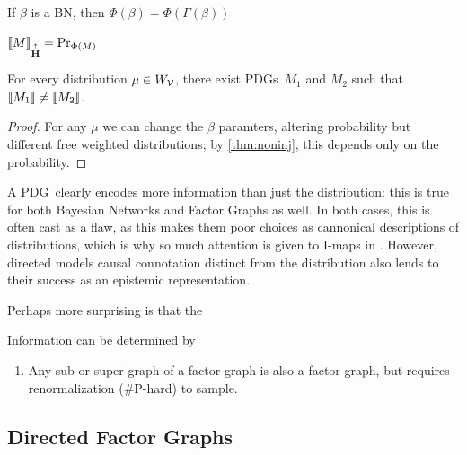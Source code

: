 \documentclass{article}
\newcommand\MaxEnt{{\overset{\uparrow}{\mathbf H}}}
\newcommand\bmu{\boldsymbol{\mu}}
\newcommand{\MN}{PDG}
\newcommand{\MNs}{\MN s}
\begin{document}

	\begin{prop}
		If $\beta$ is a BN, then $\Phi(\beta)  = \Phi(\Gamma(\beta))$
	\end{prop}


	\begin{conj}
		$\bbr{M}_\MaxEnt = \Pr_{\Phi(M)}$
	\end{conj}
	\begin{coro}\label{thm:noninj}
		For every distribution $\mu \in W_{\cal V}$, there exist \MNs\ $M_1$ and $M_2$ such that $\llbracket M_1\rrbracket \neq \llbracket M_2\rrbracket$. 
	\end{coro}
	\begin{proof}
		For any $\mu$ we can change the $\beta$ paramters, altering probability but different free weighted distributions; by \cref{thm:noninj}, this depends only on the probability.
	\end{proof}
	
	A \MN\ clearly encodes more information than just the distribution: this is true for both Bayesian Networks and Factor Graphs as well. In both cases, this is often cast as a flaw, as this makes them poor choices as cannonical descriptions of distributions, which is why so much attention is given to I-maps in \cite{graphical models}. However, directed models causal connotation distinct from the distribution also lends to their success as an epistemic representation.
	
	Perhaps more surprising is that the 
	
	\begin{conj}
		Information can be determined by 
	\end{conj}

	\begin{fact}
		\begin{enumerate}
			\item Any sub or super-graph of a factor graph is also a factor graph, but requires renormalization (\#P-hard) to sample.
		\end{enumerate}
	\end{fact}

	\subsection{Directed Factor Graphs}
	
\end{document}
